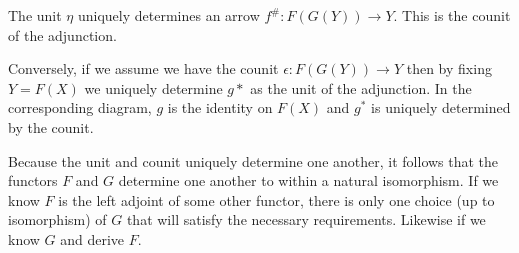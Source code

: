 \documentclass{article}
\begin{document}
\begin{enumerate}
\begin{center}
  \end{center}
  The unit $\eta$ uniquely determines an arrow $f^{\#} : F(G(Y)) \rightarrow Y$.
  This is the counit of the adjunction. %

  Conversely, if we assume we have the counit $\epsilon : F(G(Y)) \rightarrow Y$ then by fixing $Y = F(X)$ we uniquely determine $g*$ as the unit of the adjunction.
  In the corresponding diagram, $g$ is the identity on $F(X)$ and $g^*$ is uniquely determined by the counit.

  Because the unit and counit uniquely determine one another, it follows that the functors $F$ and $G$ determine one another to within a natural isomorphism.
  If we know $F$ is the left adjoint of some other functor, there is only one choice (up to isomorphism) of $G$ that will satisfy the necessary requirements.
  Likewise if we know $G$ and derive $F$.

\end{enumerate}
\end{document}
